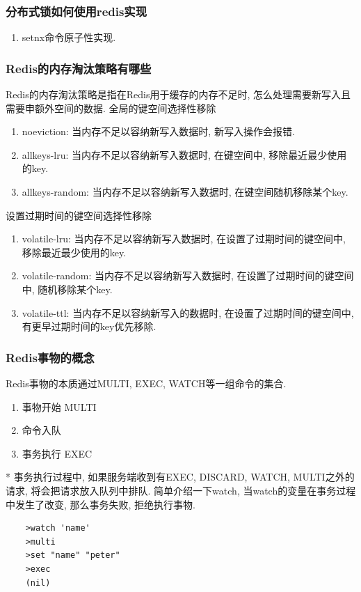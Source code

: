 \documentclass[UTF8]{ctexart}
\begin{document}
\subsubsection{分布式锁如何使用redis实现}
\begin{enumerate}
	\item setnx命令原子性实现. 
\end{enumerate}
\subsubsection{Redis的内存淘汰策略有哪些}
Redis的内存淘汰策略是指在Redis用于缓存的内存不足时, 怎么处理需要新写入且需要申额外空间的数据.
全局的键空间选择性移除
\begin{enumerate}
	
	\item noeviction: 当内存不足以容纳新写入数据时, 新写入操作会报错.
	\item allkeys-lru: 当内存不足以容纳新写入数据时, 在键空间中, 移除最近最少使用的key.
	\item allkeys-random: 当内存不足以容纳新写入数据时, 在键空间随机移除某个key.
\end{enumerate}
设置过期时间的键空间选择性移除
\begin{enumerate}
	
	\item volatile-lru: 当内存不足以容纳新写入数据时, 在设置了过期时间的键空间中, 移除最近最少使用的key.
	\item volatile-random: 当内存不足以容纳新写入数据时, 在设置了过期时间的键空间中, 随机移除某个key.
	\item volatile-ttl: 当内存不足以容纳新写入的数据时, 在设置了过期时间的键空间中, 有更早过期时间的key优先移除. 
\end{enumerate}
\subsubsection{Redis事物的概念}
Redis事物的本质通过MULTI, EXEC, WATCH等一组命令的集合. 
\begin{enumerate}

	\item 事物开始 MULTI
	\item 命令入队
	\item 事务执行 EXEC
\end{enumerate}
* 事务执行过程中, 如果服务端收到有EXEC, DISCARD, WATCH, MULTI之外的请求, 将会把请求放入队列中排队.
简单介绍一下watch, 当watch的变量在事务过程中发生了改变, 那么事务失败, 拒绝执行事物.
\begin{lstlisting}
	>watch 'name'
	>multi
	>set "name" "peter"
	>exec
	(nil)
\end{lstlisting}
\end{document}
